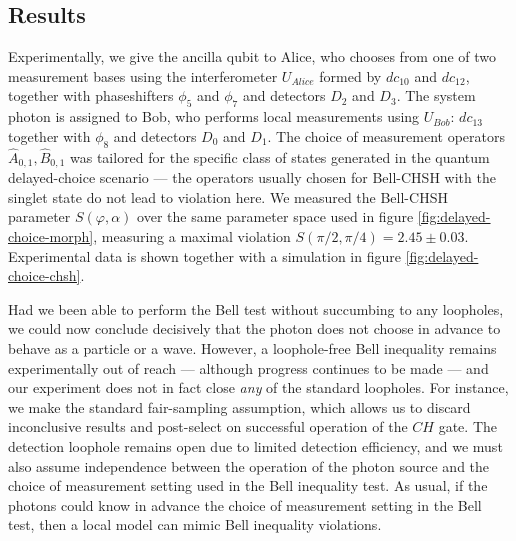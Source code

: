 \subsection{Results} 
Experimentally, we give the ancilla qubit to Alice, who chooses from one of two measurement bases using the interferometer $U_{Alice}$ formed by $dc_{10}$ and $dc_{12}$, together with phaseshifters $\phi_5$ and $\phi_7$ and detectors $D_2$ and $D_3$. The system photon is assigned to Bob, who performs local measurements using $U_{Bob}$: $dc_{13}$ together with $\phi_8$ and detectors $D_0$ and $D_1$. The choice of measurement operators $\hat{A}_{0,1}, \hat{B}_{0,1}$ was tailored for the specific class of states generated in the quantum delayed-choice scenario --- the operators usually chosen for Bell-CHSH with the singlet state do not lead to violation here. We measured the Bell-CHSH parameter $S(\varphi, \alpha)$ over the same parameter space used in figure \ref{fig:delayed-choice-morph}, measuring a maximal violation $S(\pi/2, \pi/4) = 2.45 \pm 0.03$. Experimental data is shown together with a simulation in figure \ref{fig:delayed-choice-chsh}.

Had we been able to perform the Bell test without succumbing to any loopholes, we could now conclude decisively that the photon does not choose in advance to behave as a particle or a wave. However, a loophole-free Bell inequality remains experimentally out of reach --- although progress continues to be made \cite{Scheidl2010, Giustina2013a} --- and our experiment does not in fact close \emph{any} of the standard loopholes.  For instance, we make the standard fair-sampling assumption, which allows us to discard inconclusive results and post-select on successful operation of the $CH$ gate.  The detection loophole remains open due to limited detection efficiency, and we must also assume independence between the operation of the photon source and the choice of measurement setting used in the Bell inequality test. As usual, if the photons could know in advance the choice of measurement setting in the Bell test, then a local model can mimic Bell inequality violations.  

